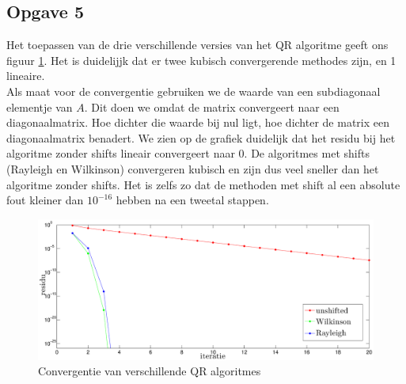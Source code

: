 \documentclass[a4paper, 12pt, titlepage]{report}
\begin{document}
\subsection{Opgave 5}
Het toepassen van de drie verschillende versies van het QR algoritme geeft ons figuur \ref{3QRs}. Het is duidelijjk dat er twee kubisch convergerende methodes zijn, en 1 lineaire. \\
Als maat voor de convergentie gebruiken we de waarde van een subdiagonaal elementje van $A$. Dit doen we omdat de matrix convergeert naar een diagonaalmatrix. Hoe dichter die waarde bij nul ligt, hoe dichter de matrix een diagonaalmatrix benadert. We zien op de grafiek duidelijk dat het residu bij het algoritme zonder shifts lineair convergeert naar 0. De algoritmes met shifts (Rayleigh en Wilkinson) convergeren kubisch en zijn dus veel sneller dan het algoritme zonder shifts. Het is zelfs zo dat de methoden met shift al een absolute fout kleiner dan $10^{-16}$ hebben na een tweetal stappen.\\

\begin{figure}[htb]
	\centering
	\includegraphics[width=\textwidth]{3QRS.eps}
	\caption{Convergentie van verschillende QR algoritmes}
	\label{3QRs}
\end{figure}
\end{document}
